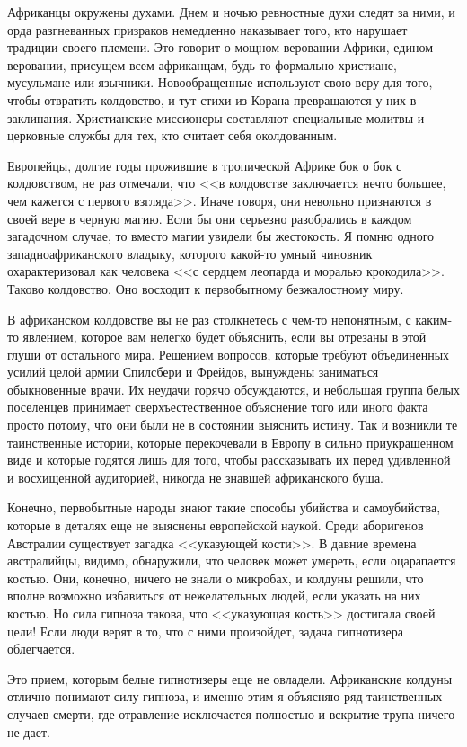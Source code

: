 \documentclass[12pt,a4paper,twoside,openany,svgnames]{memoir}
\begin{document}
Африканцы окружены духами. Днем и ночью ревностные духи следят за ними, и орда разгневанных призраков немедленно наказывает того, кто нарушает традиции своего племени. Это говорит о мощном веровании Африки, едином веровании, присущем всем африканцам, будь то формально христиане, мусульмане или язычники. Новообращенные используют свою веру для того, чтобы отвратить колдовство, и тут стихи из Корана превращаются у них в заклинания. Христианские миссионеры составляют специальные молитвы и церковные службы для тех, кто считает себя околдованным.

Европейцы, долгие годы прожившие в тропической Африке бок о бок с колдовством, не раз отмечали, что <<в колдовстве заключается нечто большее, чем кажется с первого взгляда>>. Иначе говоря, они невольно признаются в своей вере в черную магию. Если бы они серьезно разобрались в каждом загадочном случае, то вместо магии увидели бы жестокость. Я помню одного западноафриканского владыку, которого какой-то умный чиновник охарактеризовал как человека <<с сердцем леопарда и моралью крокодила>>. Таково колдовство. Оно восходит к первобытному безжалостному миру.

В африканском колдовстве вы не раз столкнетесь с чем-то непонятным, с каким-то явлением, которое вам нелегко будет объяснить, если вы отрезаны в этой глуши от остального мира. Решением вопросов, которые требуют объединенных усилий целой армии Спилсбери и Фрейдов, вынуждены заниматься обыкновенные врачи. Их неудачи горячо обсуждаются, и небольшая группа белых поселенцев принимает сверхъестественное объяснение того или иного факта просто потому, что они были не в состоянии выяснить истину. Так и возникли те таинственные истории, которые перекочевали в Европу в сильно приукрашенном виде и которые годятся лишь для того, чтобы рассказывать их перед удивленной и восхищенной аудиторией, никогда не знавшей африканского буша.

Конечно, первобытные народы знают такие способы убийства и самоубийства, которые в деталях еще не выяснены европейской наукой. Среди аборигенов Австралии существует загадка <<указующей кости>>. В давние времена австралийцы, видимо, обнаружили, что человек может умереть, если оцарапается костью. Они, конечно, ничего не знали о микробах, и колдуны решили, что вполне возможно избавиться от нежелательных людей, если указать на них костью. Но сила гипноза такова, что <<указующая кость>> достигала своей цели! Если люди верят в то, что с ними произойдет, задача гипнотизера облегчается.

Это прием, которым белые гипнотизеры еще не овладели. Африканские колдуны отлично понимают силу гипноза, и именно этим я объясняю ряд таинственных случаев смерти, где отравление исключается полностью и вскрытие трупа ничего не дает.
\end{document}
